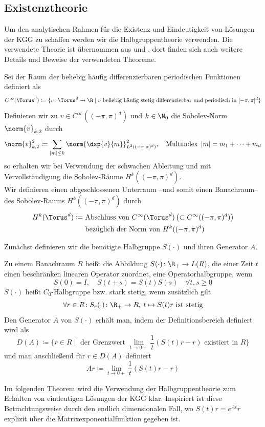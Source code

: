 \subsection{Existenztheorie}
Um den analytischen Rahmen für die Existenz und Eindeutigkeit von Lösungen der KGG zu schaffen werden wir die Halbgruppentheorie verwenden. Die verwendete Theorie ist übernommen aus \autocite{HundSchnau} und \autocite{EngelNagel}, dort finden sich auch weitere Details und Beweise der verwendeten Theoreme.
\begin{mathdef}
Sei der Raum der beliebig häufig differenzierbaren periodischen Funktionen definiert als
\[C^\infty (\Torus^d)\coloneqq \lbrace v\colon \Torus^d\to\R \mid v \text{ beliebig häufig stetig differenzierbar und periodisch in }[-\pi,\pi]^d\rbrace\]
Definieren wir zu $v\in C^\infty((-\pi,\pi)^d)$ und $k\in\N_0$ die Sobolev-Norm $\norm{v}_{k,2}$ durch
\[\norm{v}_{k,2}^2\coloneqq \sum_{|m|\le k}\norm{\dxp{v}{m}}_{L^2((-\pi,\pi)^d)}^2,\quad \text{Multiindex }\, |m|=m_1+\dots + m_d\]
so erhalten wir bei Verwendung der schwachen Ableitung und mit Vervollständigung die Sobolev-Räume $H^k((-\pi,\pi)^d)$.\\
Wir definieren einen abgeschlossenen Unterraum --und somit einen Banachraum-- des Sobolev-Raums $H^k((-\pi,\pi)^d)$ durch
\begin{align*}H^k(\Torus^d)\coloneqq &\text{ Abschluss von } C^\infty(\Torus^d)\left(\subset C^\infty((-\pi,\pi)^d)\right)\\
&\text{ bezüglich der Norm von } H^k((-\pi,\pi)^d)
\end{align*}
\end{mathdef}
Zunächst definieren wir die benötigte Halbgruppe $S(\cdot)$ und ihren Generator $A$.
\begin{mathdef}
Zu einem Banachraum $R$ heißt die Abbildung $S(\cdot)\colon \R_+\to L(R)$, die einer Zeit $t$ einen beschränken linearen Operator zuordnet, eine Operatorhalbgruppe, wenn
\[S(0)=I,\quad S(t+s)=S(t)S(s)\quad \forall t,s\ge 0\]
$S(\cdot)$ heißt $C_0$-Halbgruppe bzw. stark stetig, wenn zusätzlich gilt
\[\forall r\in R\colon S_r(\cdot)\colon \R_+\to R,\: t\mapsto S(t)r \text{ ist stetig}\]
Den Generator $A$ von $S(\cdot)$ erhält man, indem der Definitionsbereich definiert wird als
\[D(A)\coloneqq \lbrace r\in R\mid \text{ der Grenzwert } \lim\limits_{t\to0+}\frac{1}{t}(S(t)r-r)\text { existiert in }R\rbrace\]
und man anschließend für $r\in D(A)$ definiert
\[Ar\coloneqq \lim\limits_{t\to0+}\frac{1}{t}(S(t)r-r)\]
\end{mathdef}
Im folgenden Theorem wird die Verwendung der Halbgruppentheorie zum Erhalten von eindeutigen Lösungen der KGG klar. Inspiriert ist diese Betrachtungsweise durch den endlich dimensionalen Fall, wo $S(t)r=e^{At}r$ explizit über die Matrixexponentialfunktion gegeben ist.
